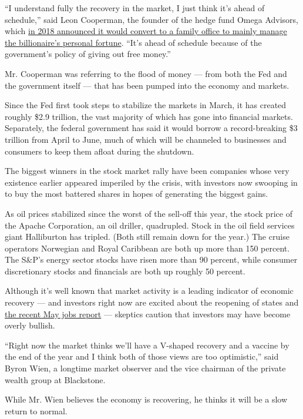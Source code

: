 ``I understand fully the recovery in the market, I just think it's ahead
of schedule,'' said Leon Cooperman, the founder of the hedge fund Omega
Advisors, which
\href{https://www.nytimes3xbfgragh.onion/2018/07/23/business/dealbook/leon-cooperman-hedge-fund.html}{in
2018 announced it would convert to a family office to mainly manage the
billionaire's personal fortune}. ``It's ahead of schedule because of the
government's policy of giving out free money.''

Mr. Cooperman was referring to the flood of money --- from both the Fed
and the government itself --- that has been pumped into the economy and
markets.

Since the Fed first took steps to stabilize the markets in March, it has
created roughly \$2.9 trillion, the vast majority of which has gone into
financial markets. Separately, the federal government has said it would
borrow a record-breaking \$3 trillion from April to June, much of which
will be channeled to businesses and consumers to keep them afloat during
the shutdown.

The biggest winners in the stock market rally have been companies whose
very existence earlier appeared imperiled by the crisis, with investors
now swooping in to buy the most battered shares in hopes of generating
the biggest gains.

As oil prices stabilized since the worst of the sell-off this year, the
stock price of the Apache Corporation, an oil driller, quadrupled. Stock
in the oil field services giant Halliburton has tripled. (Both still
remain down for the year.) The cruise operators Norwegian and Royal
Caribbean are both up more than 150 percent. The S\&P's energy sector
stocks have risen more than 90 percent, while consumer discretionary
stocks and financials are both up roughly 50 percent.

Although it's well known that market activity is a leading indicator of
economic recovery --- and investors right now are excited about the
reopening of states and
\href{https://www.nytimes3xbfgragh.onion/2020/06/05/business/economy/jobs-report.html}{the
recent May jobs report} --- skeptics caution that investors may have
become overly bullish.

``Right now the market thinks we'll have a V-shaped recovery and a
vaccine by the end of the year and I think both of those views are too
optimistic,'' said Byron Wien, a longtime market observer and the vice
chairman of the private wealth group at Blackstone.

While Mr. Wien believes the economy is recovering, he thinks it will be
a slow return to normal.

